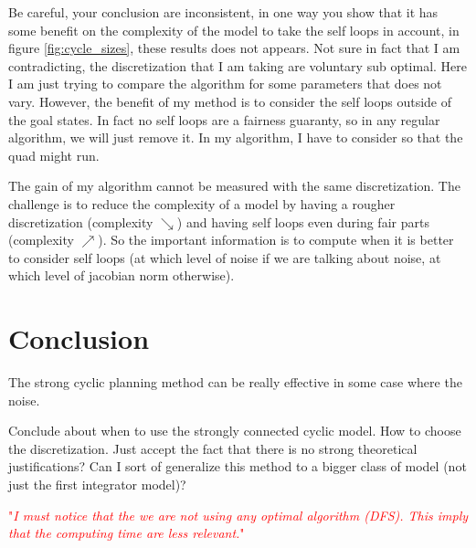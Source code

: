 \documentclass{article}
\newcommand\comment[1]{\textcolor{red}{"\textit{#1}"}}
\begin{document}
Be careful, your conclusion are inconsistent, in one way you show that it has some benefit on the complexity of the model to take the self loops in account, in figure \ref{fig:cycle_sizes}, these results does not appears. Not sure in fact that I am contradicting, the discretization that I am taking are voluntary sub optimal. Here I am just trying to compare the algorithm for some parameters that does not vary. However, the benefit of my method is to consider the self loops outside of the goal states. In fact no self loops are a fairness guaranty, so in any regular algorithm, we will just remove it. In my algorithm, I have to consider so that the quad might run.

The gain of my algorithm cannot be measured with the same discretization. The challenge is to reduce the complexity of a model by having a rougher discretization (complexity $\searrow$) and having self loops even during fair parts (complexity $\nearrow$). So the important information is to compute when it is better to consider self loops (at which level of noise if we are talking about noise, at which level of jacobian norm otherwise).

\section{Conclusion}
The strong cyclic planning method can be really effective in some case where the noise.

Conclude about when to use the strongly connected cyclic model.
How to choose the discretization.
Just accept the fact that there is no strong theoretical justifications?
Can I sort of generalize this method to a bigger class of model (not just the first integrator model)?

\comment{I must notice that the we are not using any optimal algorithm (DFS). This imply that the computing time are less relevant.}
\end{document}
